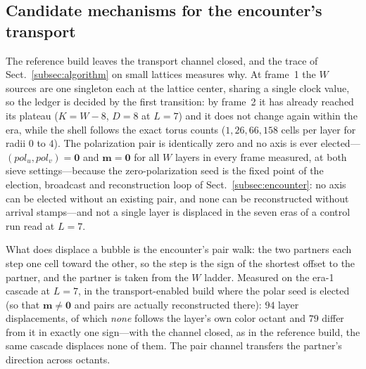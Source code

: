 \documentclass[a4paper]{article}
\begin{document}
\subsection{Candidate mechanisms for the encounter's transport}
\label{subsec:candidate-transport}
The reference build leaves the transport channel closed, and the trace of Sect.~\ref{subsec:algorithm} on small lattices measures why.  At frame~1 the $W$ sources are one singleton each at the lattice center, sharing a single clock value, so the ledger is decided by the first transition: by frame~2 it has already reached its plateau ($K=W-8$, $D=8$ at $L=7$) and it does not change again within the era, while the shell follows the exact torus counts ($1, 26, 66, 158$ cells per layer for radii $0$ to $4$).  The polarization pair is identically zero and no axis is ever elected---$(pol_u,pol_v)=\mathbf 0$ and $\boldsymbol m=\mathbf 0$ for all $W$ layers in every frame measured, at both sieve settings---because the zero-polarization seed is the fixed point of the election, broadcast and reconstruction loop of Sect.~\ref{subsec:encounter}: no axis can be elected without an existing pair, and none can be reconstructed without arrival stamps---and not a single layer is displaced in the seven eras of a control run read at $L=7$.

What does displace a bubble is the encounter's pair walk: the two partners each step one cell toward the other, so the step is the sign of the shortest offset to the partner, and the partner is taken from the $W$ ladder.  Measured on the era-1 cascade at $L=7$, in the transport-enabled build where the polar seed is elected (so that $\boldsymbol m\neq\mathbf 0$ and pairs are actually reconstructed there): $94$ layer displacements, of which \emph{none} follows the layer's own color octant and $79$ differ from it in exactly one sign---with the channel closed, as in the reference build, the same cascade displaces none of them.  The pair channel transfers the partner's direction across octants.
\end{document}

